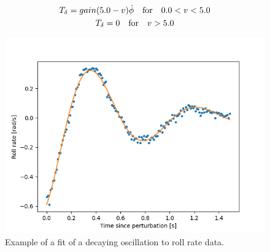 \documentclass[12pt]{article}
\begin{document}
\begin{gather}
    T_{\delta} = gain(5.0 - v)\Dot{\phi} \quad \textnormal{for} \quad  0.0 < v < 5.0 \\
    T_{\delta} = 0 \quad \textnormal{for} \quad v > 5.0
\end{gather}

\begin{figure}[h]
    \centering
    \includegraphics[width=\columnwidth]{figures/example_roll_rate_fit.png}
    \caption{Example of a fit of a decaying oscillation to roll rate data.} \label{example-roll-rate-fit}
\end{figure}
\end{document}
